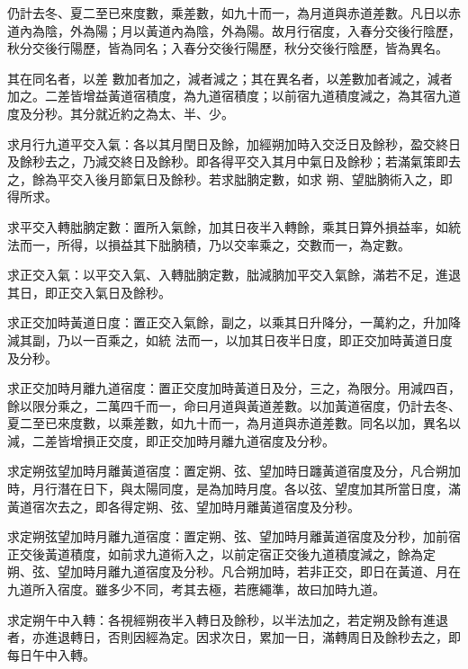 \begin{pinyinscope}
 仍計去冬、夏二至已來度數，乘差數，如九十而一，為月道與赤道差數。凡日以赤道內為陰，外為陽；月以黃道內為陰，外為陽。故月行宿度，入春分交後行陰歷，秋分交後行陽歷，皆為同名；入春分交後行陽歷，秋分交後行陰歷，皆為異名。



 其在同名者，以差
 數加者加之，減者減之；其在異名者，以差數加者減之，減者加之。二差皆增益黃道宿積度，為九道宿積度；以前宿九道積度減之，為其宿九道度及分秒。其分就近約之為太、半、少。



 求月行九道平交入氣：各以其月閏日及餘，加經朔加時入交泛日及餘秒，盈交終日及餘秒去之，乃減交終日及餘秒。即各得平交入其月中氣日及餘秒；若滿氣策即去之，餘為平交入後月節氣日及餘秒。若求朏朒定數，如求
 朔、望朏朒術入之，即得所求。



 求平交入轉朏朒定數：置所入氣餘，加其日夜半入轉餘，乘其日算外損益率，如統法而一，所得，以損益其下朏朒積，乃以交率乘之，交數而一，為定數。



 求正交入氣：以平交入氣、入轉朏朒定數，朏減朒加平交入氣餘，滿若不足，進退其日，即正交入氣日及餘秒。



 求正交加時黃道日度：置正交入氣餘，副之，以乘其日升降分，一萬約之，升加降減其副，乃以一百乘之，如統
 法而一，以加其日夜半日度，即正交加時黃道日度及分秒。



 求正交加時月離九道宿度：置正交度加時黃道日及分，三之，為限分。用減四百，餘以限分乘之，二萬四千而一，命曰月道與黃道差數。以加黃道宿度，仍計去冬、夏二至已來度數，以乘差數，如九十而一，為月道與赤道差數。同名以加，異名以減，二差皆增損正交度，即正交加時月離九道宿度及分秒。



 求定朔弦望加時月離黃道宿度：置定朔、弦、望加時日躔黃道宿度及分，凡合朔加時，月行潛在日下，與太陽同度，是為加時月度。各以弦、望度加其所當日度，滿黃道宿次去之，即各得定朔、弦、望加時月離黃道宿度及分秒。



 求定朔弦望加時月離九道宿度：置定朔、弦、望加時月離黃道宿度及分秒，加前宿正交後黃道積度，如前求九道術入之，以前定宿正交後九道積度減之，餘為定
 朔、弦、望加時月離九道宿度及分秒。凡合朔加時，若非正交，即日在黃道、月在九道所入宿度。雖多少不同，考其去極，若應繩準，故曰加時九道。



 求定朔午中入轉：各視經朔夜半入轉日及餘秒，以半法加之，若定朔及餘有進退者，亦進退轉日，否則因經為定。因求次日，累加一日，滿轉周日及餘秒去之，即每日午中入轉。




\end{pinyinscope}
